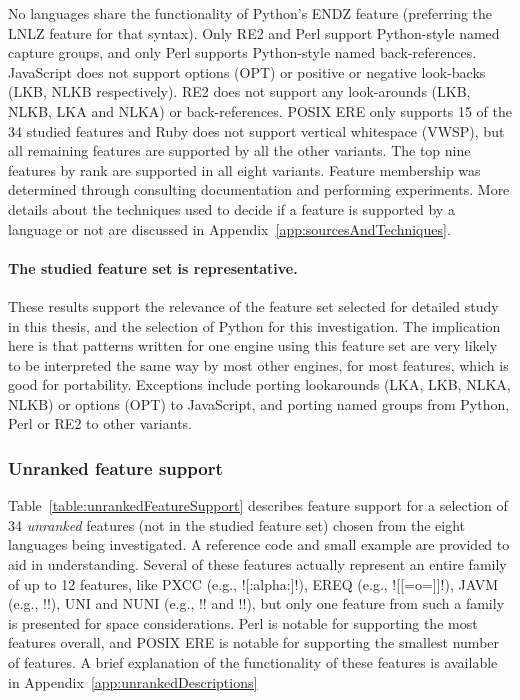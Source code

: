 No languages share the functionality of Python's ENDZ feature (preferring the LNLZ feature for that syntax).  Only RE2 and Perl support Python-style named capture groups, and only Perl supports Python-style named back-references.  JavaScript does not support options (OPT) or positive or negative look-backs (LKB, NLKB respectively).  RE2 does not support any look-arounds (LKB, NLKB, LKA and NLKA) or back-references.  POSIX ERE only supports 15 of the 34 studied features and Ruby does not support vertical whitespace (VWSP), but all remaining features are supported by all the other variants.  The top nine features by rank are supported in all eight variants.  Feature membership was determined through consulting documentation and performing experiments.  More details about the techniques used to decide if a feature is supported by a language or not are discussed in Appendix~\ref{app:sourcesAndTechniques}.

\paragraph{The studied feature set is representative.}  These results support the relevance of the feature set selected for detailed study in this thesis, and the selection of Python for this investigation.  The implication here is that patterns written for one engine using this feature set are very likely to be interpreted the same way by most other engines, for most features, which is good for portability.  Exceptions include porting lookarounds (LKA, LKB, NLKA, NLKB) or options (OPT) to JavaScript,  and porting named groups from Python, Perl or RE2 to other variants.

\afterpage{\clearpage}



\subsubsection{Unranked feature support}
Table~\ref{table:unrankedFeatureSupport} describes feature support for a selection of 34 \emph{unranked} features (not in the studied feature set) chosen from the eight languages being investigated.  A reference code and small example are provided to aid in understanding.  Several of these features actually represent an entire family of up to 12 features, like PXCC (e.g., \cverb![:alpha:]!), EREQ (e.g., \cverb![[=o=]]!), JAVM (e.g., \cverb!!), UNI and NUNI (e.g., \cverb!\pL! and \cverb!\PM!), but only one feature from such a family is presented for space considerations.  Perl is notable for supporting the most features overall, and POSIX ERE is notable for supporting the smallest number of features.  A brief explanation of the functionality of these features is available in Appendix~\ref{app:unrankedDescriptions}


